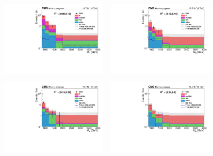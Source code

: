 \begin{figure}[htpb]
\centering
\includegraphics[width=0.48\textwidth]{figures/razor_results/bg_prediction_plot_R2bin0_BPS}
~
\includegraphics[width=0.48\textwidth]{figures/razor_results/bg_prediction_plot_R2bin1_BPS}

\includegraphics[width=0.48\textwidth]{figures/razor_results/bg_prediction_plot_R2bin2_BPS}
~
\includegraphics[width=0.48\textwidth]{figures/razor_results/bg_prediction_plot_R2bin3_BPS}


\end{figure}

